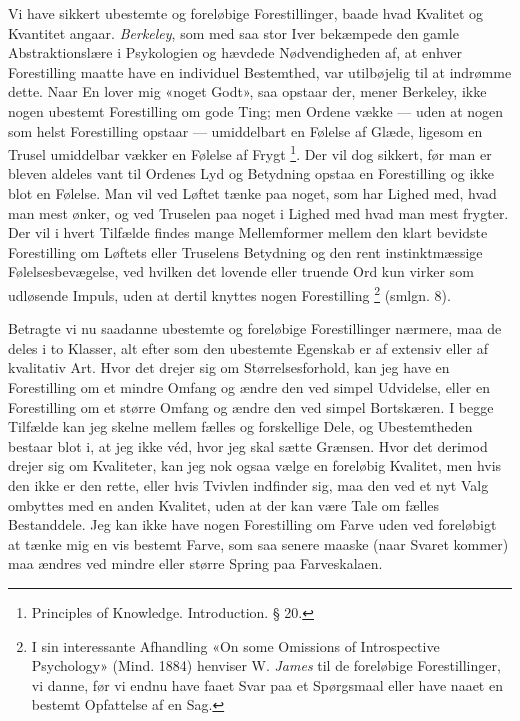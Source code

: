 \documentclass[12pt,a4paper,openany]{book}
\begin{document}
Vi have sikkert ubestemte og foreløbige Forestillinger, baade hvad Kvalitet og
Kvantitet angaar. \emph{Berkeley}, som med saa stor Iver bekæmpede den gamle
Abstraktionslære i Psykologien og hævdede Nødvendigheden af, at enhver
Forestilling maatte have en individuel Bestemthed, var utilbøjelig til at
indrømme dette. Naar En lover mig «noget Godt», saa opstaar der, mener
Berkeley, ikke nogen ubestemt Forestilling om gode Ting; men Ordene vække ---
uden at nogen som helst Forestilling opstaar --- umiddelbart en Følelse af
Glæde, ligesom en Trusel umiddelbar vækker en Følelse af Frygt%
\footnote[1]{Principles of Knowledge. Introduction. § 20.}. Der vil dog
sikkert, før man er bleven aldeles vant til Ordenes Lyd og Betydning opstaa en
Forestilling og ikke blot en Følelse. Man vil ved Løftet tænke paa noget, som
har Lighed med, hvad man mest ønker, %
og ved Truselen paa noget i Lighed med hvad man mest frygter. Der vil i hvert
Tilfælde findes mange Mellemformer mellem den klart bevidste Forestilling om
Løftets eller Truselens Betydning og den rent instinktmæssige
Følelsesbevægelse, ved hvilken det lovende eller truende Ord kun virker som
udløsende Impuls, uden at dertil knyttes nogen Forestilling%
\footnote[2]{I sin interessante Afhandling «On some Omissions of Introspective
Psychology» (Mind. 1884) henviser W. \emph{James} til de foreløbige
Forestillinger, vi danne, før vi endnu have faaet Svar paa et Spørgsmaal eller
have naaet en bestemt Opfattelse af en Sag.} (smlgn. 8).

Betragte vi nu saadanne ubestemte og foreløbige Forestillinger nærmere, maa de
deles i to Klasser, alt efter som den ubestemte Egenskab er af extensiv eller
af kvalitativ Art. Hvor det drejer sig om Størrelsesforhold, kan jeg have en
Forestilling om et mindre Omfang og ændre den ved simpel Udvidelse, eller en
Forestilling om et større Omfang og ændre den ved simpel Bortskæren. I begge
Tilfælde kan jeg skelne mellem fælles og forskellige Dele, og Ubestemtheden
bestaar blot i, at jeg ikke véd, hvor jeg skal sætte Grænsen. Hvor det derimod
drejer sig om Kvaliteter, kan jeg nok ogsaa vælge en foreløbig Kvalitet, men
hvis den ikke er den rette, eller hvis Tvivlen indfinder sig, maa den ved et
nyt Valg ombyttes med en anden Kvalitet, uden at der kan være Tale om fælles
Bestanddele. Jeg kan ikke have nogen Forestilling om Farve uden ved foreløbigt
at tænke mig en vis bestemt Farve, som saa senere maaske (naar Svaret kommer)
maa ændres ved mindre eller større Spring paa Farveskalaen.
\end{document}
